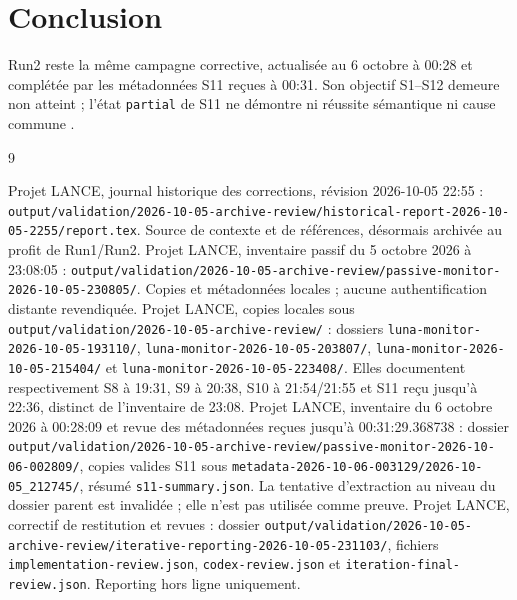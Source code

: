 \documentclass[11pt,a4paper]{article}
\newcommand{\code}[1]{{\urlstyle{tt}\nolinkurl{#1}}}
\begin{document}
\section{Conclusion}
Run2 reste la même campagne corrective, actualisée au 6 octobre à 00:28 et complétée par les métadonnées S11 reçues à 00:31. Son objectif S1–S12 demeure non atteint ; l'état \code{partial} de S11 ne démontre ni réussite sémantique ni cause commune \cite{inv6}.
\small
\setlength{\parskip}{1pt}
\begin{thebibliography}{9}
\setlength{\itemsep}{0pt}
 Projet LANCE, journal historique des corrections, révision 2026-10-05 22:55 : \code{output/validation/2026-10-05-archive-review/historical-report-2026-10-05-2255/report.tex}. Source de contexte et de références, désormais archivée au profit de Run1/Run2.
 Projet LANCE, inventaire passif du 5 octobre 2026 à 23:08:05 : \code{output/validation/2026-10-05-archive-review/passive-monitor-2026-10-05-230805/}. Copies et métadonnées locales ; aucune authentification distante revendiquée.
 Projet LANCE, copies locales sous \code{output/validation/2026-10-05-archive-review/} : dossiers \code{luna-monitor-2026-10-05-193110/}, \code{luna-monitor-2026-10-05-203807/}, \code{luna-monitor-2026-10-05-215404/} et \code{luna-monitor-2026-10-05-223408/}. Elles documentent respectivement S8 à 19:31, S9 à 20:38, S10 à 21:54/21:55 et S11 reçu jusqu'à 22:36, distinct de l'inventaire de 23:08.
 Projet LANCE, inventaire du 6 octobre 2026 à 00:28:09 et revue des métadonnées reçues jusqu'à 00:31:29.368738 : dossier \code{output/validation/2026-10-05-archive-review/passive-monitor-2026-10-06-002809/}, copies valides S11 sous \code{metadata-2026-10-06-003129/2026-10-05_212745/}, résumé \code{s11-summary.json}. La tentative d'extraction au niveau du dossier parent est invalidée ; elle n'est pas utilisée comme preuve.
 Projet LANCE, correctif de restitution et revues : dossier \code{output/validation/2026-10-05-archive-review/iterative-reporting-2026-10-05-231103/}, fichiers \code{implementation-review.json}, \code{codex-review.json} et \code{iteration-final-review.json}. Reporting hors ligne uniquement.
\end{thebibliography}
\normalsize
\end{document}
